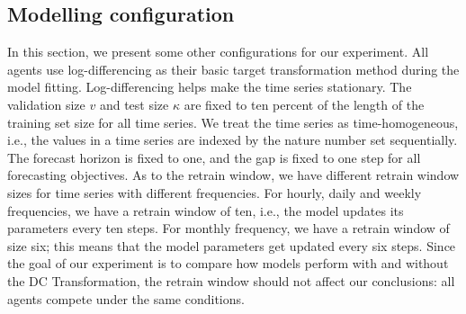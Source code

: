 \subsection{Modelling configuration}
In this section, we present some other configurations for our experiment. All agents use log-differencing as their basic target transformation method during the model fitting. Log-differencing helps make the time series stationary. The validation size $v$ and test size $\kappa$ are fixed to ten percent of the length of the training set size for all time series. We treat the time series as time-homogeneous, i.e., the values in a time series are indexed by the nature number set sequentially. The forecast horizon is fixed to one, and the gap is fixed to one step for all forecasting objectives. As to the retrain window, we have different retrain window sizes for time series with different frequencies. For hourly, daily and weekly frequencies, we have a retrain window of ten, i.e., the model updates its parameters every ten steps. For monthly frequency, we have a retrain window of size six; this means that the model parameters get updated every six steps. Since the goal of our experiment is to compare how models perform with and without the DC Transformation, the retrain window should not affect our conclusions: all agents compete under the same conditions.
